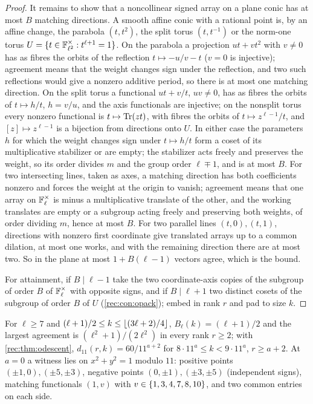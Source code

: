 \begin{proof}
It remains to show that a noncollinear signed array on a plane conic has at most $B$ matching directions.
A smooth affine conic with a rational point is, by an affine change, the parabola $(t,t^2)$, the split torus
$(t,t^{-1})$ or the norm-one torus $U=\{t\in\mathbb{F}_{\ell^2}^\times:t^{\ell+1}=1\}$. On the parabola a projection $ut+vt^2$ with $v\ne0$ has as
fibres the orbits of the reflection $t\mapsto-u/v-t$ ($v=0$ is injective); agreement means that the weight changes
sign under the reflection, and two such reflections would give a nonzero additive period, so there is at
most one matching direction. On the split torus a functional $ut+v/t$, $uv\ne0$, has as fibres the orbits of
$t\mapsto h/t$, $h=v/u$, and the axis functionals are injective; on the nonsplit torus every nonzero functional is
$t\mapsto\operatorname{Tr}(zt)$, with fibres the orbits of $t\mapsto z^{\ell-1}/t$, and $[z]\mapsto z^{\ell-1}$ is a bijection from directions onto $U$. In
either case the parameters $h$ for which the weight changes sign under $t\mapsto h/t$ form a coset of its
multiplicative stabilizer or are empty; the stabilizer acts freely and preserves the weight, so its order
divides $m$ and the group order $\ell\mp1$, and is at most $B$. For two intersecting lines, taken as axes, a matching
direction has both coefficients nonzero and forces the weight at the origin to vanish; agreement means that
one array on $\mathbb{F}_\ell^\times$ is minus a multiplicative translate of the other, and the working translates are empty or a
subgroup acting freely and preserving both weights, of order dividing $m$, hence at most $B$. For two parallel
lines $(t,0),(t,1)$, directions with nonzero first coordinate give translated arrays up to a common dilation, at
most one works, and with the remaining direction there are at most two. So in the plane at most $1+B(\ell-1)$
vectors agree, which is the bound.

For attainment, if $B\mid\ell-1$ take the two coordinate-axis copies of the subgroup of order $B$ of $\mathbb{F}_\ell^\times$ with
opposite signs, and if $B\mid\ell+1$ two distinct cosets of the subgroup of order $B$ of $U$ (\cref{rec:con:opack}); embed in
rank $r$ and pad to size $k$.
\end{proof}

For $\ell\ge7$ and $(\ell+1)/2\le k\le\lfloor(3\ell+2)/4\rfloor$, $B_\ell(k)=(\ell+1)/2$ and the largest agreement is $(\ell^2+1)/(2\ell^2)$ in every rank
$r\ge2$; with \cref{rec:thm:odescent}, $d_{11}(r,k)=60/11^{a+2}$ for $8\cdot11^a\le k<9\cdot11^a$, $r\ge a+2$. At $a=0$ a witness lies on
$x^2+y^2=1$ modulo $11$: positive points $(\pm1,0),(\pm5,\pm3)$, negative points $(0,\pm1),(\pm3,\pm5)$ (independent signs), matching
functionals $(1,v)$ with $v\in\{1,3,4,7,8,10\}$, and two common entries on each side.

